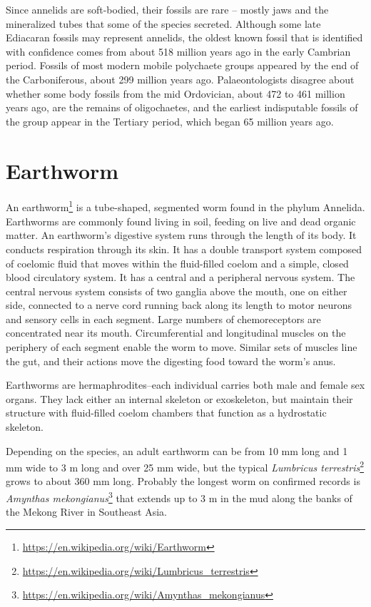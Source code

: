 \documentclass[]{book}
\let\rmarkdownfootnote\footnote%
\def\footnote{\protect\rmarkdownfootnote}
\renewcommand{\href}[2]{#2\footnote{\url{#1}}}
\begin{document}
Since annelids are soft-bodied, their fossils are rare -- mostly jaws and the mineralized tubes that some of the species secreted. Although some late Ediacaran fossils may represent annelids, the oldest known fossil that is identified with confidence comes from about 518 million years ago in the early Cambrian period. Fossils of most modern mobile polychaete groups appeared by the end of the Carboniferous, about 299 million years ago. Palaeontologists disagree about whether some body fossils from the mid Ordovician, about 472 to 461 million years ago, are the remains of oligochaetes, and the earliest indisputable fossils of the group appear in the Tertiary period, which began 65 million years ago.

\hypertarget{earthworm}{%
\section{Earthworm}\label{earthworm}}

An \href{https://en.wikipedia.org/wiki/Earthworm}{earthworm} is a tube-shaped, segmented worm found in the phylum Annelida. Earthworms are commonly found living in soil, feeding on live and dead organic matter. An earthworm's digestive system runs through the length of its body. It conducts respiration through its skin. It has a double transport system composed of coelomic fluid that moves within the fluid-filled coelom and a simple, closed blood circulatory system. It has a central and a peripheral nervous system. The central nervous system consists of two ganglia above the mouth, one on either side, connected to a nerve cord running back along its length to motor neurons and sensory cells in each segment. Large numbers of chemoreceptors are concentrated near its mouth. Circumferential and longitudinal muscles on the periphery of each segment enable the worm to move. Similar sets of muscles line the gut, and their actions move the digesting food toward the worm's anus.

Earthworms are hermaphrodites--each individual carries both male and female sex organs. They lack either an internal skeleton or exoskeleton, but maintain their structure with fluid-filled coelom chambers that function as a hydrostatic skeleton.

Depending on the species, an adult earthworm can be from 10 mm long and 1 mm wide to 3 m long and over 25 mm wide, but the typical \href{https://en.wikipedia.org/wiki/Lumbricus_terrestris}{\emph{Lumbricus terrestris}} grows to about 360 mm long. Probably the longest worm on confirmed records is \href{https://en.wikipedia.org/wiki/Amynthas_mekongianus}{\emph{Amynthas mekongianus}} that extends up to 3 m in the mud along the banks of the Mekong River in Southeast Asia.
\end{document}
